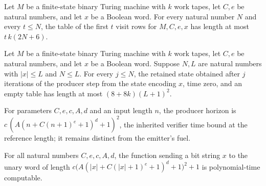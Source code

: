 \begin{lemma}
\label{Complexity.clVisitRows_size}
\leanok
{}
Let $M$ be a finite-state binary Turing machine with $k$ work tapes, let $C,e$ be
natural numbers, and let $x$ be a Boolean word. For every natural number $N$ and every
$t\le N$, the table of the first $t$ visit rows for $M,C,e,x$ has length at most
$t\,k(2N+6)$.
\end{lemma}

\begin{lemma}
\label{Complexity.clVisitState_size}
\leanok
{}
Let $M$ be a finite-state binary Turing machine with $k$ work tapes, let $C,e$ be
natural numbers, and let $x$ be a Boolean word. Suppose $N,L$ are natural numbers with
$|x|\le L$ and $N\le L$. For every $j\le N$, the retained state obtained after $j$
iterations of the producer step from the state encoding $x$, time zero, and an empty
table has length at most $(8+8k)(L+1)^2$.
\end{lemma}

\begin{definition}
\label{Complexity.clProducerHorizon}
\leanok
For parameters $C, e, c, A, d$ and an input length $n$, the producer horizon is $c\,(A(n + C(n+1)^e + 1)^d + 1)^2$, the inherited verifier time bound at the reference length; it remains distinct from the emitter's fuel.
\end{definition}

\begin{lemma}
\label{Complexity.clProducerClock_native}
\leanok
{}
For all natural numbers $C,e,c,A,d$, the function sending a bit string $x$ to the unary
word of length $c\bigl(A(|x|+C(|x|+1)^e+1)^d+1\bigr)^2+1$ is polynomial-time computable.
\end{lemma}

